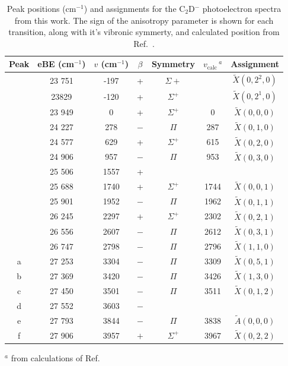 \documentclass[journal=jacsat,manuscript=suppinfo]{achemso}
\newcommand{\onlinecite}[1]{\hspace{-1 ex} \nocite{#1}\citenum{#1}}
\begin{document}
\begin{table}
	\caption{Peak positions (cm$^{-1}$) and assignments for the C$_2$D$^-$ photoelectron spectra from this work. The sign of the anisotropy parameter is shown for each transition, along with it's vibronic symmerty, and calculated position from Ref.~\cite{tar03}.} \label{tab:2}
	\begin{tabular}{c c c c c c c }
		\hline Peak & eBE (cm$^{-1}$) & $v$ (cm$^{-1}$) & $\beta$ & Symmetry &  $v_{\text{calc}}\,^a$ &{Assignment}  \\ 
		 \hline \hline
		& 23 751 & -197 & + & $\Sigma{+}$ & & $\tilde{X}(0,2^2,0)$ \\
		& 23829 & -120 & + & $\Sigma^+$ & & $\tilde{X}(0,2^1,0)$  \\
		& 23 949 & 0 & + & $\Sigma^+$ & 0 & $\tilde{X}(0,0,0)$ \\
		& 24 227 & 278 & $-$ & $\Pi$ & 287 & $\tilde{X}(0,1,0)$ \\
		& 24 577 & 629  & + & $\Sigma^+$ & 615 & $\tilde{X}(0,2,0)$ \\
		& 24 906 & 957 & $-$ & $\Pi$ & 953 & $\tilde{X}(0,3,0)$ \\ 
		& 25 506 & 1557 & + &  &  &  \\
		& 25 688 & 1740 & + & $\Sigma^+$ & 1744 & $\tilde{X}(0,0,1)$ \\
		& 25 901 & 1952 & $-$ & $\Pi$ & 1962 & $\tilde{X}(0,1,1)$ \\
		& 26 245 & 2297 & + & $\Sigma^+$ & 2302 & $\tilde{X}(0,2,1)$ \\
		& 26 556 & 2607 & $-$ & $\Pi$ & 2612 & $\tilde{X}(0,3,1)$ \\
		& 26 747 & 2798 & $-$ & $\Pi$ & 2796 & $\tilde{X}(1,1,0)$ \\
		a & 27 253 & 3304 & $-$ & $\Pi$ & 3309 & $\tilde{X}(0,5,1)$ \\
		b & 27 369 & 3420 & $-$ & $\Pi$ & 3426 & $\tilde{X}(1,3,0)$ \\
		c & 27 450 & 3501 & $-$ & $\Pi$ & 3511 & $\tilde{X}(0,1,2)$ \\
		d & 27 552 & 3603 & $-$ &  &  &  \\
		e & 27 793 & 3844 & $-$ & $\Pi$ & 3838 & $\tilde{A}(0,0,0)$\\
		f & 27 906 & 3957 & $+$ & $\Sigma^+$ & 3967 & $\tilde{X}(0,2,2)$ \\
	\end{tabular}
	
	\raggedright

	$^a$ from calculations of Ref.~\onlinecite{tar03}
\end{table}



\newpage

\end{document}
